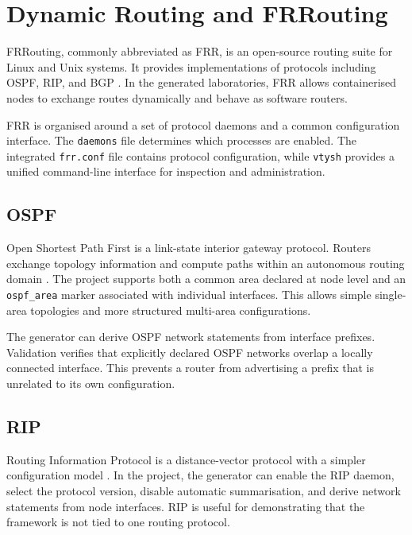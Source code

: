 \section{Dynamic Routing and FRRouting}
\label{sec:frrouting-background}

FRRouting, commonly abbreviated as FRR, is an open-source routing suite for
Linux and Unix systems. It provides implementations of protocols including
OSPF, RIP, and BGP \cite{frr_user_guide}. In the generated laboratories,
FRR allows containerised nodes to exchange routes dynamically and behave as
software routers.

FRR is organised around a set of protocol daemons and a common configuration
interface. The \texttt{daemons} file determines which processes are enabled.
The integrated \texttt{frr.conf} file contains protocol configuration, while
\texttt{vtysh} provides a unified command-line interface for inspection and
administration.

\subsection{OSPF}
\label{subsec:ospf-background}

Open Shortest Path First is a link-state interior gateway protocol. Routers
exchange topology information and compute paths within an autonomous routing
domain \cite{rfc2328}. The project supports both a common area declared at node level and an
\texttt{ospf\_area} marker associated with individual interfaces. This allows
simple single-area topologies and more structured multi-area configurations.

The generator can derive OSPF network statements from interface prefixes.
Validation verifies that explicitly declared OSPF networks overlap a locally
connected interface. This prevents a router from advertising a prefix that is
unrelated to its own configuration.

\subsection{RIP}
\label{subsec:rip-background}

Routing Information Protocol is a distance-vector protocol with a simpler
configuration model \cite{rfc2453}. In the project, the generator can enable the RIP daemon,
select the protocol version, disable automatic summarisation, and derive
network statements from node interfaces. RIP is useful for demonstrating that
the framework is not tied to one routing protocol.

